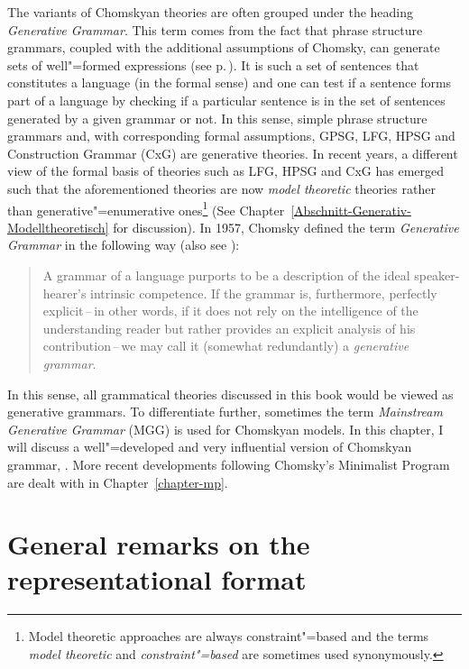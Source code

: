 The variants of Chomskyan theories are often grouped under the heading \emph{Generative Grammar}.
This term comes from the fact that phrase structure grammars, coupled with the additional assumptions of Chomsky, can generate
sets of well"=formed expressions (see p.\,\pageref{Seite-generiert}). It is such a set of sentences that constitutes a language (in the formal
sense) and one can test if a sentence forms part of a language by checking if a particular sentence is in the set of sentences generated
by a given grammar or not. In this sense, simple phrase structure grammars and, with corresponding formal assumptions, GPSG, LFG, 
HPSG and Construction Grammar (CxG) are generative theories.
In recent years, a different view of the formal basis of theories such as LFG, HPSG and CxG has
emerged such that the aforementioned theories are now \emph{model theoretic}
theories rather than generative"=enumerative ones\footnote{
Model theoretic approaches are always constraint"=based and the terms \emph{model theoretic} and \emph{constraint"=based} are 
sometimes used synonymously. 
} (See Chapter~\ref{Abschnitt-Generativ-Modelltheoretisch} for discussion). In 1957, Chomsky defined the term \emph{Generative Grammar}
in the following way (also see \citealp[]{Chomsky95a-u}):
\begin{quote}
A grammar of a language purports to be a description of the ideal speaker-hearer's intrinsic
competence. If the grammar is, furthermore, perfectly explicit\,--\,in other words, if it does not
rely on the intelligence of the understanding reader but rather provides an explicit analysis of
his contribution\,--\,we may call it (somewhat redundantly) a \emph{generative
  grammar}. \citep[]{Chomsky65a}
\end{quote}
In this sense, all grammatical theories discussed in this book would be viewed as generative grammars.
To differentiate further, sometimes the term \emph{Mainstream Generative Grammar} (MGG) is used \citep[]{CJ2005a} for Chomskyan models.
In this chapter, I will discuss a well"=developed and very influential version of Chomskyan
grammar, \gbt. More recent developments following Chomsky's Minimalist Program are dealt with in Chapter~\ref{chapter-mp}.

\section{General remarks on the representational format}
\label{Abschnitt-GB-allgemein}

